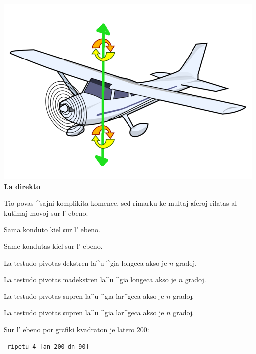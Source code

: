 \begin{minipage}{5.5cm}
\begin{center}
\includegraphics*[scale=0.3]{bildoj/plane-heading.png}
\textbf{La direkto}
\end{center}
\end{minipage}

Tio povas ^sajni komplikita komence, sed rimarku ke multaj aferoj 
rilatas al kutimaj movoj sur l' ebeno.


Sama konduto kiel sur l' ebeno.


Same kondutas kiel sur l' ebeno.


La testudo pivotas dekstren la^u ^gia longeca akso je $n$ gradoj.


La testudo pivotas madekstren la^u ^gia longeca akso je $n$ gradoj.


La testudo pivotas supren la^u ^gia lar^geca akso je $n$ gradoj.


La testudo pivotas supren la^u ^gia lar^geca akso je $n$ gradoj.

Sur l' ebeno por grafiki kvadraton je latero $200$:
\begin{verbatim}
 ripetu 4 [an 200 dn 90] 
\end{verbatim}

